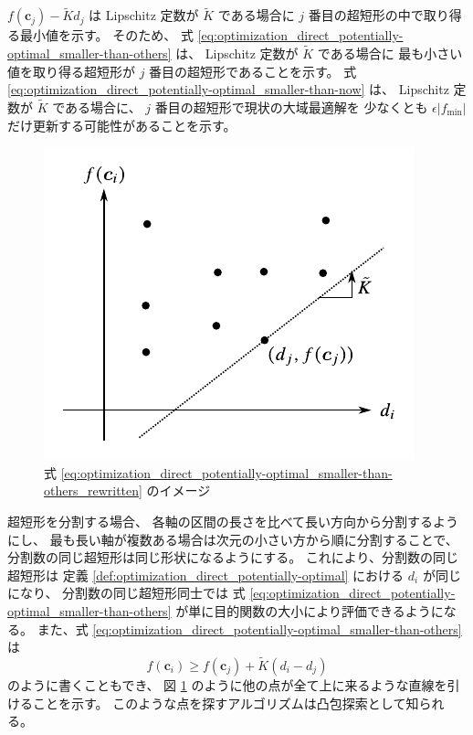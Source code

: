 $f(\bm{c}_j) - \tilde{K} d_j$ は
Lipschitz 定数が $\tilde{K}$ である場合に $j$ 番目の超短形の中で取り得る最小値を示す。
そのため、
式 \eqref{eq:optimization_direct_potentially-optimal_smaller-than-others} は、
Lipschitz 定数が $\tilde{K}$ である場合に
最も小さい値を取り得る超短形が $j$ 番目の超短形であることを示す。
式 \eqref{eq:optimization_direct_potentially-optimal_smaller-than-now} は、
Lipschitz 定数が $\tilde{K}$ である場合に、
$j$ 番目の超短形で現状の大域最適解を
少なくとも $\epsilon |f_{\text{min}}|$ だけ更新する可能性があることを示す。

\begin{figure}[tp]
    \centering
    \includegraphics[width=0.7\linewidth]{optimization/DIRECT-potentially-optimal.pdf}
    \caption{式 \eqref{eq:optimization_direct_potentially-optimal_smaller-than-others_rewritten} のイメージ}
    \label{fig:optimization_direct_potentially-optimal_smaller-than-others-image}
\end{figure}

超短形を分割する場合、
各軸の区間の長さを比べて長い方向から分割するようにし、
最も長い軸が複数ある場合は次元の小さい方から順に分割することで、
分割数の同じ超短形は同じ形状になるようにする。
これにより、分割数の同じ超短形は
定義 \ref{def:optimization_direct_potentially-optimal} における $d_i$ が同じになり、
分割数の同じ超短形同士では
式 \eqref{eq:optimization_direct_potentially-optimal_smaller-than-others}
が単に目的関数の大小により評価できるようになる。
また、式 \eqref{eq:optimization_direct_potentially-optimal_smaller-than-others} は
\begin{equation}
    f(\bm{c}_i) \ge f(\bm{c}_j) + \tilde{K} (d_i - d_j)
    \label{eq:optimization_direct_potentially-optimal_smaller-than-others_rewritten}
\end{equation}
のように書くこともでき、
図 \ref{fig:optimization_direct_potentially-optimal_smaller-than-others-image}
のように他の点が全て上に来るような直線を引けることを示す。
このような点を探すアルゴリズムは凸包探索として知られる。

